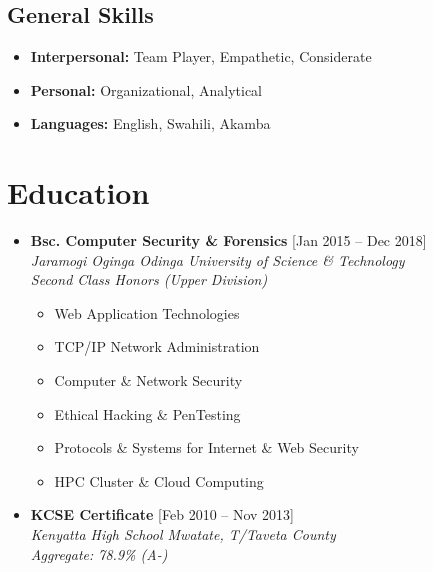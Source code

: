 \documentclass[11pt,a4paper]{moderncv}
\begin{document}
\subsection{\textbf{General Skills}}
\begin{itemize}
	
	\item \textbf{Interpersonal:} Team Player, Empathetic, Considerate 

	\item \textbf{Personal:} Organizational, Analytical  
	\item \textbf{Languages:} English, Swahili, Akamba
\end{itemize}
	
\section{Education}

\begin{itemize}

\item \textbf{Bsc. Computer Security \& Forensics } \hfill [Jan 2015 {--} Dec 2018]\\
\textit{Jaramogi Oginga Odinga University of Science \& Technology\\ 
Second Class Honors (Upper Division)}
\begin{itemize}
	\item Web Application Technologies
	\item TCP/IP Network Administration
	\item Computer \& Network Security
	\item Ethical Hacking \& PenTesting
	\item Protocols \& Systems for Internet \& Web Security
	\item HPC Cluster \& Cloud Computing
\end{itemize}

\item \textbf{KCSE Certificate} \hfill [Feb 2010 {--} Nov 2013]\\
\textit{Kenyatta High School Mwatate, T/Taveta County\\ 
Aggregate: 78.9\% (A-)}

\end{itemize}

\end{document}
